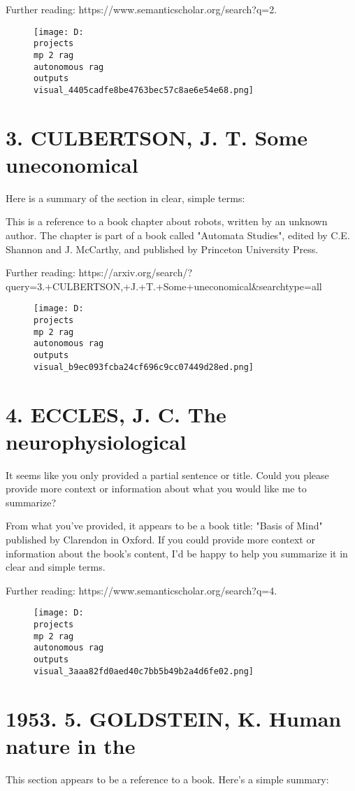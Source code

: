 \documentclass[12pt,a4paper]{article}
\begin{document}
Further reading: https://www.semanticscholar.org/search?q=2.%
\begin{figure}[h]
\centering
\texttt{[image: D:\\projects\\mp 2 rag\\autonomous rag\\outputs\\visual\_4405cadfe8be4763bec57c8ae6e54e68.png]}
\end{figure}
\section{3. CULBERTSON, J. T. Some uneconomical}
Here is a summary of the section in clear, simple terms:

This is a reference to a book chapter about robots, written by an unknown author. The chapter is part of a book called "Automata Studies", edited by C.E. Shannon and J. McCarthy, and published by Princeton University Press.

Further reading: https://arxiv.org/search/?query=3.+CULBERTSON,+J.+T.+Some+uneconomical&searchtype=all
\begin{figure}[h]
\centering
\texttt{[image: D:\\projects\\mp 2 rag\\autonomous rag\\outputs\\visual\_b9ec093fcba24cf696c9cc07449d28ed.png]}
\end{figure}
\section{4. ECCLES, J. C. The neurophysiological}
It seems like you only provided a partial sentence or title. Could you please provide more context or information about what you would like me to summarize?

From what you've provided, it appears to be a book title: "Basis of Mind" published by Clarendon in Oxford. If you could provide more context or information about the book's content, I'd be happy to help you summarize it in clear and simple terms.

Further reading: https://www.semanticscholar.org/search?q=4.%
\begin{figure}[h]
\centering
\texttt{[image: D:\\projects\\mp 2 rag\\autonomous rag\\outputs\\visual\_3aaa82fd0aed40c7bb5b49b2a4d6fe02.png]}
\end{figure}
\section{1953.
5. GOLDSTEIN, K. Human nature in the}
This section appears to be a reference to a book. Here's a simple summary:
\end{document}
